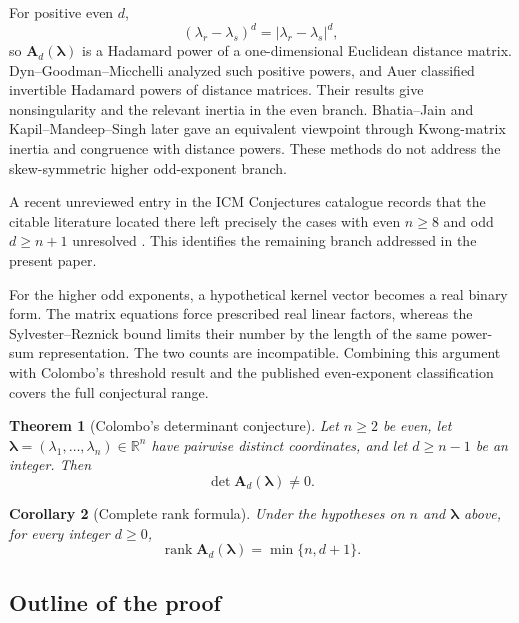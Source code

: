\documentclass[11pt,letterpaper,reqno]{amsart}
\numberwithin{equation}{section}
\newtheorem{theorem}{Theorem}[section]
\newtheorem{corollary}[theorem]{Corollary}
\theoremstyle{definition}
\newcommand{\RR}{\mathbb{R}}
\newcommand{\rank}{\operatorname{rank}}
\newcommand{\Mat}[1]{\mathbf{#1}}
\newcommand{\vct}[1]{\boldsymbol{#1}}
\begin{document}
For positive even \(d\),
\[
 (\lambda_r-\lambda_s)^d=|\lambda_r-\lambda_s|^d,
\]
so \(\Mat{A}_d(\vct{\lambda})\) is a Hadamard power of a
one-dimensional Euclidean distance matrix.  Dyn--Goodman--Micchelli
\cite{DynGoodmanMicchelli1986} analyzed such positive powers, and Auer
\cite{Auer1998} classified invertible Hadamard powers of distance
matrices.  Their results give nonsingularity and the relevant inertia in
the even branch.  Bhatia--Jain
\cite[Theorem~1(iv)]{BhatiaJain2024} and Kapil--Mandeep--Singh
\cite{KapilMandeepSingh2024} later gave an equivalent viewpoint through
Kwong-matrix inertia and congruence with distance powers.  These methods
do not address the skew-symmetric higher odd-exponent branch.

A recent unreviewed entry in the ICM Conjectures catalogue records that
the citable literature located there left precisely the cases with even \(n\ge8\) and odd \(d\ge n+1\) unresolved
\cite{ICMConjecturesEntry}.  This identifies the remaining branch
addressed in the present paper.

For the higher odd exponents, a hypothetical kernel vector becomes a
real binary form.  The matrix equations force prescribed real linear
factors, whereas the Sylvester--Reznick bound limits their number by the
length of the same power-sum representation.  The two counts are
incompatible.  Combining this argument with Colombo's threshold result
and the published even-exponent classification covers the full
conjectural range.

\begin{theorem}[Colombo's determinant conjecture]\label{thm:main}
Let \(n\ge2\) be even, let
\(\vct{\lambda}=(\lambda_1,\ldots,\lambda_n)\in\RR^n\) have pairwise
distinct coordinates, and let \(d\ge n-1\) be an integer.  Then
\[
 \det \Mat{A}_d(\vct{\lambda})\ne0.
\]
\end{theorem}

\begin{corollary}[Complete rank formula]\label{cor:rank-formula}
Under the hypotheses on \(n\) and \(\vct{\lambda}\) above, for every
integer \(d\ge0\),
\[
 \rank \Mat{A}_d(\vct{\lambda})=\min\{n,d+1\}.
\]
\end{corollary}

\subsection{Outline of the proof}
\end{document}
